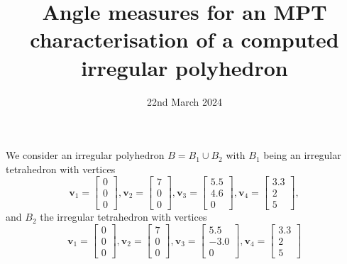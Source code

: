\documentclass[a4paper,12]{article}
\theoremstyle{definition}
\begin{document}
\title{Angle measures for an MPT characterisation of a computed irregular polyhedron}
\date{22nd March 2024}
\maketitle
We consider an irregular polyhedron $B=B_1 \cup B_2$ with $B_1$ being an irregular tetrahedron with vertices
\begin{equation}\label{eqn:tet1}
{\bm v}_1 = \begin{bmatrix} 0 \\ 0 \\ 0 \end{bmatrix}, {\bm v}_2 = \begin{bmatrix} 7 \\ 0 \\ 0 \end{bmatrix}, {\bm v}_3 = \begin{bmatrix} 5.5 \\ 4.6 \\ 0 \end{bmatrix}, {\bm v}_4 = \begin{bmatrix} 3.3 \\ 2 \\ 5 \end{bmatrix},
\end{equation}
and $B_2$ the irregular tetrahedron with vertices
\begin{equation}
{\bm v}_1 = \begin{bmatrix} 0 \\ 0 \\ 0 \end{bmatrix}, {\bm v}_2 = \begin{bmatrix} 7 \\ 0 \\ 0 \end{bmatrix}, {\bm v}_3 = \begin{bmatrix} 5.5 \\ -3.0 \\ 0 \end{bmatrix}, {\bm v}_4 = \begin{bmatrix} 3.3 \\ 2 \\ 5 \end{bmatrix}
\end{equation}
\end{document}

